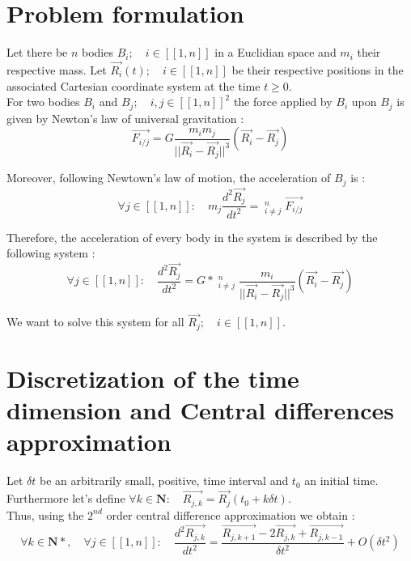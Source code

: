 \documentclass[a4paper,11pt]{article}
\begin{document}
\section{Problem formulation}
Let there be $n$ bodies $B_i;\quad i \in [[1, n]]$ in a Euclidian space and $m_i$
their respective mass.
Let $\vec{R_i}(t);\quad i \in [[1,n]]$ be their respective positions in the associated Cartesian
coordinate system at the time $t \ge 0$.\\
For two bodies $B_i$ and $B_j;\quad i,j \in [[1, n]]^2$ the force applied by $B_i$ upon
$B_j$ is given by Newton's law of universal gravitation :
\begin{equation}
  \vec{F_{i/j}} = G \frac{m_i m_j}{||{\vec{R_i} - \vec{R_j}}||^3} (\vec{R_i} - \vec{R_j})
\end{equation}

Moreover, following Newtown's law of motion, the acceleration of $B_j$ is :
\begin{equation}
  \forall j \in [[1, n]]:\quad m_j \frac{d^2\vec{R_j}}{dt^2} =
  \mathop{\sum_{i=1}}_{i \ne j}^n \vec{F_{i/j}}
\end{equation}

Therefore, the acceleration of every body in the system is described by the following system :
\begin{equation}
  \forall j \in [[1, n]]:\quad \frac{d^2\vec{R_j}}{dt^2} =
  G*\mathop{\sum_{i=1}}_{i \ne j}^n \frac{m_i}{||{\vec{R_i} - \vec{R_j}}||^3} (\vec{R_i} - \vec{R_j})
  \label{odesystem}
\end{equation}

We want to solve this system for all $\vec{R_j}; \quad i \in [[1, n]]$.

\section{Discretization of the time dimension and Central differences approximation}
Let $\delta t$ be an arbitrarily small, positive, time interval and $t_0$ an initial time.
Furthermore let's define $\forall k \in \mathbf{N}:\quad \vec{R_{j,k}} = \vec{R_j}(t_0+k\delta t)$.\\
Thus, using the $2^{nd}$ order central difference approximation we obtain :
\begin{equation}
  \forall k \in \mathbf{N*},\quad \forall j \in [[1, n]]:\quad
  \frac{d^2\vec{R_{j,k}}}{dt^2} = \frac{\vec{R_{j,k+1}} - 2 \vec{R_{j,k}} + \vec{R_{j,k-1}}}{\delta t^2}+ O(\delta t^2)
\end{equation}
\end{document}
